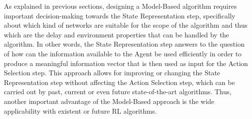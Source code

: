                 As explained in previous sections, designing a Model-Based algorithm requires important decision-making towards the State Representation step, specifically about which kind of networks are suitable for the scope of the algorithm and thus which are the delay and environment properties that can be handled by the algorithm. In other words, the State Representation step answers to the question of how can the information available to the Agent be used efficiently in order to produce a meaningful information vector that is then used as input for the Action Selection step. This approach allows for improving or changing the State Representation step without affecting the Action Selection step, which can be carried out by past, current or even future state-of-the-art algorithms. Thus, another important advantage of the Model-Based approach is the wide applicability with existent or future RL algorithms.
                
                    
                    
                    
                    
                    
        
